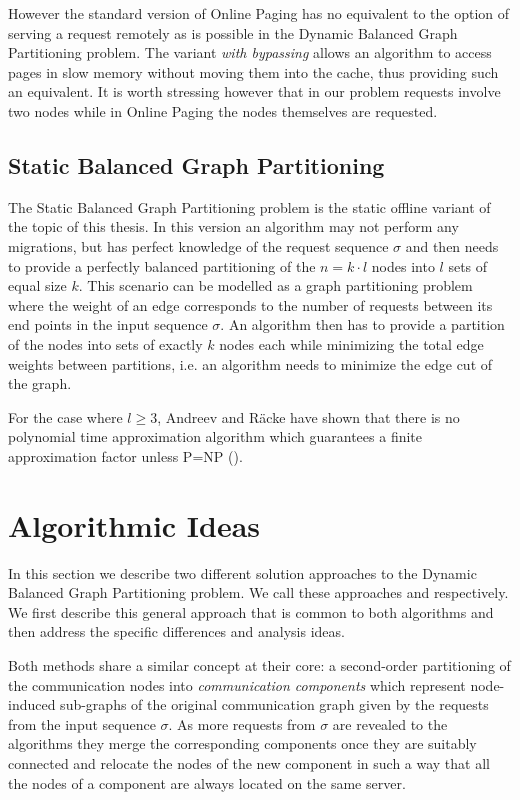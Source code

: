 \documentclass[a4paper,xcolor=dvipsnames, tikz, 12pt]{article}
\newcommand{\coreDel}{\text{C{\scriptsize REP}-C{\scriptsize ORE}}}
\newcommand{\adjDel}{\text{C{\scriptsize REP}-A{\scriptsize DJ}}}
\theoremstyle{definition}
\begin{document}
	However the standard version of Online Paging has no equivalent to the option of serving a request remotely as is possible in the Dynamic Balanced Graph Partitioning problem. The variant \textit{with bypassing} allows an algorithm to access pages in slow memory without moving them into the cache, thus providing such an equivalent. It is worth stressing however that in our problem requests involve two nodes while in Online Paging the nodes themselves are requested.
	
	
	\subsection{Static Balanced Graph Partitioning}
	The Static Balanced Graph Partitioning problem is the static offline variant of the topic of this thesis. In this version an algorithm may not perform any migrations, but has perfect knowledge of the request sequence $\sigma$ and then needs to provide a perfectly balanced partitioning of the $n=k\cdot l$ nodes into $l$ sets of equal size $k$. This scenario can be modelled as a graph partitioning problem where the weight of an edge corresponds to the number of requests between its end points in the input sequence $\sigma$. An algorithm then has to provide a partition of the nodes into sets of exactly $k$ nodes each while minimizing the total edge weights between partitions, i.e. an algorithm needs to minimize the edge cut of the graph. 
	
	For the case where $l\geq 3$, Andreev and R\"acke have shown that there is no polynomial time approximation algorithm which guarantees a finite approximation factor unless P=NP (\cite{Andreev2006}).
	
	
	\section{Algorithmic Ideas}
	\label{algIdeas}
	In this section we describe two different solution approaches to the Dynamic Balanced Graph Partitioning problem. We call these approaches \coreDel{} and \adjDel{} respectively. We first describe this general approach that is common to both algorithms and then address the specific differences and analysis ideas.
	
	Both methods share a similar concept at their core: a second-order partitioning of the communication nodes into \textit{communication components} which represent node-induced sub-graphs of the original communication graph given by the requests from the input sequence $\sigma$. As more requests from $\sigma$ are revealed to the algorithms they merge the corresponding components once they are suitably connected and relocate the nodes of the new component in such a way that all the nodes of a component are always located on the same server.
	
\end{document}
